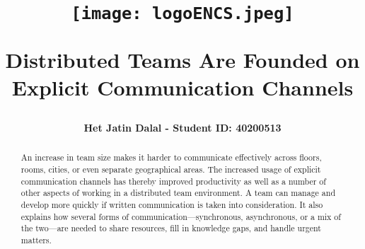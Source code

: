 \documentclass{llncs}
\begin{document}
%

\title{

\begin{figure}[ht]
    \centering
    \texttt{[image: logoENCS.jpeg]}
    \label{fig:example}
\end{figure}

Distributed Teams Are Founded on Explicit
Communication Channels\vspace{30pt}}
%
%

\author{\large \textbf{Het Jatin Dalal - Student ID: 40200513}\vspace{20pt}}
%
%

{\def\addcontentsline#1#2#3{}\maketitle}

\newpage
\begin{abstract}
\large An increase in team size makes it harder to communicate effectively across floors, rooms, cities, or even separate geographical areas. The increased usage of explicit communication channels has thereby improved productivity as well as a number of other aspects of working in a distributed team environment. A team can manage and develop more quickly if written communication is taken into consideration. It also explains how several forms of communication—synchronous, asynchronous, or a mix of the two—are needed to share resources, fill in knowledge gaps, and handle urgent matters. 

\end{abstract}
%
%
%
\tableofcontents
\newpage


\end{document}
